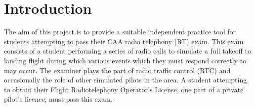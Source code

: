 \section{Introduction}

The aim of this project is to provide a suitable independent practice tool for students attempting to pass their CAA radio telephony (RT) exam.
This exam consists of a student performing a series of radio calls to simulate a full takeoff to landing flight during which various events which they must respond correctly to may occur.
The examiner plays the part of radio traffic control (RTC) and occasionally the role of other simulated pilots in the area.
A student attempting to obtain their Flight Radiotelephony Operator's License, one part of a private pilot's licence, must pass this exam.
